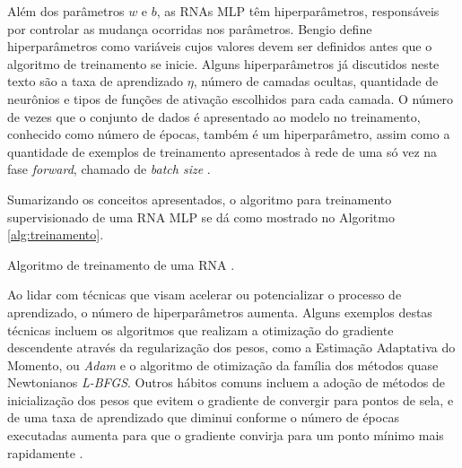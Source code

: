 Além dos parâmetros $w$ e $b$, as RNAs MLP têm hiperparâmetros, responsáveis por controlar as mudança ocorridas nos parâmetros. Bengio define hiperparâmetros como variáveis cujos valores devem ser definidos antes que o algoritmo de treinamento se inicie. Alguns hiperparâmetros já discutidos neste texto são a taxa de aprendizado $\eta$, número de camadas ocultas, quantidade de neurônios e tipos de funções de ativação escolhidos para cada camada. O número de vezes que o conjunto de dados é apresentado ao modelo no treinamento, conhecido como número de épocas, também é um hiperparâmetro, assim como a quantidade de exemplos de treinamento apresentados à rede de uma só vez na fase \emph{forward}, chamado de \emph{batch size} \cite{bengio2012practical}.

Sumarizando os conceitos apresentados, o algoritmo para treinamento supervisionado de uma RNA MLP se dá como mostrado no Algoritmo \ref{alg:treinamento}.

\begin{algorithm}[h!]
	\caption{Algoritmo de treinamento de uma RNA  \cite{Teresa:Livro}.}\label{alg:treinamento}
\end{algorithm}

Ao lidar com técnicas que visam acelerar ou potencializar o processo de aprendizado, o número de hiperparâmetros aumenta. Alguns exemplos destas técnicas incluem os algoritmos que realizam a otimização do gradiente descendente através da regularização dos pesos, como a Estimação Adaptativa do Momento, ou \emph{Adam} e o algoritmo de otimização da família dos métodos quase Newtonianos \emph{L-BFGS}. Outros hábitos comuns incluem a adoção de métodos de inicialização dos pesos que evitem o gradiente de convergir para pontos de sela, e de uma taxa de aprendizado que diminui conforme o número de épocas executadas aumenta para que o gradiente convirja para um ponto mínimo mais rapidamente \cite{goodfellow2016deep}.

